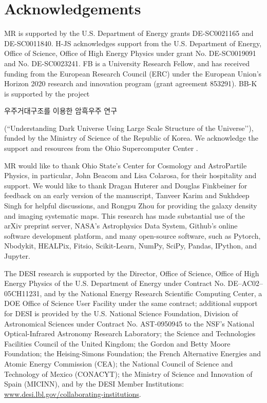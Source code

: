 \section*{Acknowledgements}
MR is supported by the U.S. Department of Energy grants DE-SC0021165 and DE-SC0011840. H-JS acknowledges support from the U.S. Department of Energy, Office of Science, 
Office of High Energy Physics under grant No. DE-SC0019091 and No. DE-SC0023241. FB is a University Research Fellow, and has received funding from the European Research Council (ERC) under the European Union’s Horizon 2020 research and innovation program (grant agreement 853291). BB-K is supported by the project \begin{CJK}{UTF8}{mj}우주거대구조를 이용한 암흑우주 연구\end{CJK} (``Understanding Dark Universe Using Large Scale Structure of the Universe’’), funded by the Ministry of Science of the Republic of Korea. We acknowledge the support and resources from the Ohio Supercomputer Center \citep[OSC;][]{OhioSupercomputerCenter1987}.  


MR would like to thank Ohio State's Center for Cosmology and AstroPartile Physics, in particular, John Beacom and Lisa Colarosa, for their hospitality and support. We would like to thank Dragan Huterer and Douglas Finkbeiner for feedback on an early version of the manuscript, Tanveer Karim and Sukhdeep Singh for helpful discussions, and Rongpu Zhou for providing the galaxy density and imaging systematic maps. This research has made substantial use of the arXiv preprint server, NASA’s Astrophysics Data System, Github's online software development platform, and many open-source software, such as Pytorch, Nbodykit, HEALPix, Fitsio, Scikit-Learn, NumPy, SciPy, Pandas, IPython, and Jupyter. 


The DESI research is supported by the Director, Office of Science, Office of High Energy Physics of the U.S. Department of Energy under Contract No. DE–AC02–05CH11231, and by the National Energy Research Scientific Computing Center, a DOE Office of Science User Facility under the same contract; additional support for DESI is provided by the U.S. National Science Foundation, Division of Astronomical Sciences under Contract No. AST-0950945 to the NSF’s National Optical-Infrared Astronomy Research Laboratory; the Science and Technologies Facilities Council of the United Kingdom; the Gordon and Betty Moore Foundation; the Heising-Simons Foundation; the French Alternative Energies and Atomic Energy Commission (CEA); the National Council of Science and Technology of Mexico (CONACYT); the Ministry of Science and Innovation of Spain (MICINN), and by the DESI Member Institutions: \href{https://www.desi.lbl.gov/collaborating-institutions}{www.desi.lbl.gov/collaborating-institutions}. 

